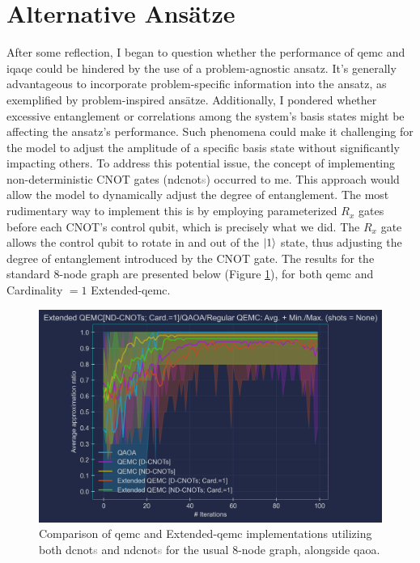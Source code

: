 \section{Alternative Ansätze}
\label{section:Alternative_ansätze}

After some reflection, I began to question whether the performance of \acrshort{qemc} and \acrshort{iqaqe} could be hindered by the use of a problem-agnostic ansatz. It's generally advantageous to incorporate problem-specific information into the ansatz, as exemplified by problem-inspired ansätze. Additionally, I pondered whether excessive entanglement or correlations among the system's basis states might be affecting the ansatz's performance. Such phenomena could make it challenging for the model to adjust the amplitude of a specific basis state without significantly impacting others. To address this potential issue, the concept of implementing non-deterministic CNOT gates (\acrshort{ndcnot}\textcolor{gray}{s}) occurred to me. This approach would allow the model to dynamically adjust the degree of entanglement. The most rudimentary way to implement this is by employing parameterized $R_x$ gates before each CNOT's control qubit, which is precisely what we did. The $R_x$ gate allows the control qubit to rotate in and out of the $\ket{1}$ state, thus adjusting the degree of entanglement introduced by the CNOT gate. The results for the standard $8$-node graph are presented below (Figure \ref{fig:ND-CNOTs}), for both \acrshort{qemc} and Cardinality $= 1$ Extended-\acrshort{qemc}.
\begin{figure}[h]
  \centering
  \includegraphics[width=1.0\textwidth]{Figures/Chapter_5/Extended-QEMC/8-node[ND-CNOTs; Card.=1](n_layers=2, step_size=0.5).png}
  \caption{Comparison of \acrshort{qemc} and Extended-\acrshort{qemc} implementations utilizing both \acrshort{dcnot}\textcolor{gray}{s} and \acrshort{ndcnot}\textcolor{gray}{s} for the usual $8$-node graph, alongside \acrshort{qaoa}.}
  \label{fig:ND-CNOTs}
\end{figure}

